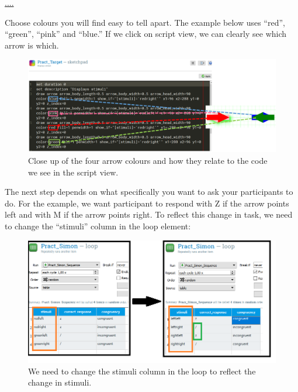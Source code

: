 \documentclass[
]{book}
\begin{document}
\url{....}

Choose colours you will find easy to tell apart. The example below uses ``red'', ``green'', ``pink'' and ``blue.'' If we click on script view, we can clearly see which arrow is which.

\begin{figure}

{\centering \includegraphics[width=0.99\linewidth]{images/changesimon/04colours} 

}

\caption{Close up of the four arrow colours and how they relate to the code we see in the script view.}\label{fig:Figure3-11}
\end{figure}

The next step depends on what specifically you want to ask your participants to do. For the example, we want participant to respond with Z if the arrow points left and with M if the arrow points right. To reflect this change in task, we need to change the ``stimuli'' column in the loop element:

\begin{figure}

{\centering \includegraphics[width=0.99\linewidth]{images/changesimon/06Loop} 

}

\caption{We need to change the stimuli column in the loop to reflect the change in stimuli.}\label{fig:Figure3-12}
\end{figure}
\end{document}
